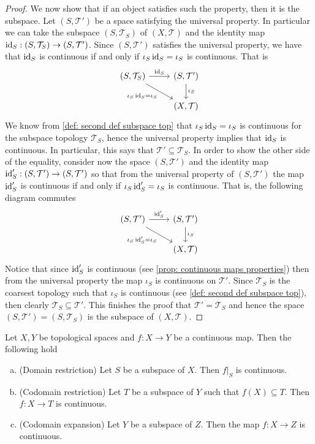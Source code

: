\begin{proof}
  We now show that if an object satisfies such the property, then it is the
  subspace. Let \((S, \mathcal T')\) be a space satisfying the universal
  property. In particular we can take the subspace \((S, \mathcal T_S)\) of
  \((X, \mathcal T)\) and the identity map \(\operatorname{id}_S: (S, \mathcal T_S) \to (S,
  \mathcal T')\). Since \((S, \mathcal T')\) satisfies the universal property,
  we have that \(\operatorname{id}_S\) is continuous if and only if \(\iota_S  \operatorname{id}_S =
  \iota_S\) is continuous. That is
  \[
    \begin{tikzcd}
      (S, \mathcal T_S)
      \ar[r, "\Id_S"]
      \ar[rd, swap, "\iota_S  \Id_S = \iota_S"]
        &(S, \mathcal T') \ar[d, "\iota_S"] \\
        &(X, \mathcal T)
    \end{tikzcd}
  \]
  We know from \cref{def: second def subspace top} that \(\iota_S  \operatorname{id}_S =
  \iota_S\) is continuous for the subspace topology \(\mathcal T_S\), hence the
  universal property implies that \(\operatorname{id}_S\) is continuous. In particular, this
  says that \(\mathcal T' \subseteq \mathcal T_S\). In order to show the other
  side of the equality, consider now the space \((S, \mathcal T')\) and the
  identity map \(\operatorname{id}_S': (S, \mathcal T') \to (S, \mathcal T')\) so that from the
  universal property of \((S, \mathcal T')\) the map \(\operatorname{id}_S'\) is continuous if
  and only if \(\iota_S  \operatorname{id}_S' = \iota_S\) is continuous. That is, the
  following diagram commutes
  \[
    \begin{tikzcd}
      (S, \mathcal T') \ar[r, "\Id_S'"]
      \ar[rd, swap, "\iota_S  \Id_S' = \iota_S"]
        &(S, \mathcal T') \ar[d, "\iota_S"] \\
        &(X, \mathcal T)
    \end{tikzcd}
  \]
  Notice that since \(\operatorname{id}_S'\) is continuous (see \cref{prop: continuous maps
  properties}) then from the universal property the map \(\iota_S\) is
  continuous on \(\mathcal T'\). Since \(\mathcal T_S\) is the coarsest topology
  such that \(\iota_S\) is continuous (see \cref{def: second def subspace top}),
  then clearly \(\mathcal T_S \subseteq \mathcal T'\). This finishes the proof
  that \(\mathcal T' = \mathcal T_S\) and hence the space \((S, \mathcal T') =
  (S, \mathcal T_S)\) is the subspace of \((X, \mathcal T)\).
\end{proof}

\begin{corollary}\label{cor: subspace maps properties}
  Let \(X, Y\) be topological spaces and \(f: X \to Y\) be a continuous map.
  Then the following hold
  \begin{enumerate}[(a)]
    \item (Domain restriction) Let \(S\) be a subspace of \(X\). Then \(f|_S\)
      is continuous.
    \item (Codomain restriction) Let \(T\) be a subspace of \(Y\) such that
      \(f(X) \subseteq T\). Then \(f: X \to T\) is continuous.
    \item (Codomain expansion) Let \(Y\) be a subspace of \(Z\). Then the map
      \(f : X \to Z\) is continuous.
  \end{enumerate}
\end{corollary}

